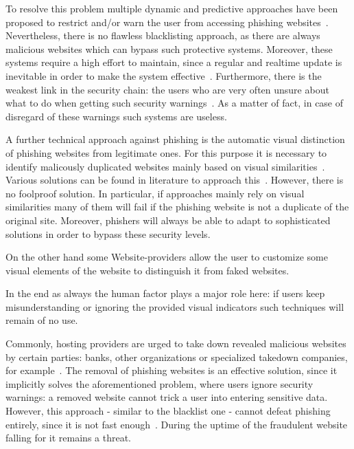 \begin{description}[leftmargin=0cm]
 To resolve this problem multiple dynamic and predictive approaches have been proposed to restrict and/or warn the user from accessing phishing websites~\cite{prakash2010phishnet, obied2009fraudulent, balzarotti2012proactive}. Nevertheless, there is no flawless blacklisting approach, as there are always malicious websites which can bypass such protective systems.
 Moreover, these systems require a high effort to maintain, since a regular and realtime update is inevitable in order to make the system effective~\cite{purkait2012phishing}. Furthermore, there is the weakest link in the security chain: the users who are very often unsure about what to do when getting such security warnings~\cite{bakhshi2009social}. As a matter of fact, in case of disregard of these warnings such systems are useless.
	\item[Visual distinction] A further technical approach against phishing is the automatic visual distinction of phishing websites from legitimate ones.
 For this purpose it is necessary to identify malicously duplicated websites mainly based on visual similarities~\cite{liu2006antiphishing}. Various solutions can be found in literature to approach this~\cite{chen2009fighting,chen2010detecting,zhang2011textual}. However, there is no foolproof solution.
 In particular, if approaches mainly rely on visual similarities many of them will fail if the phishing website is not a duplicate of the original site.
 Moreover, phishers will always be able to adapt to sophisticated solutions in order to bypass these security levels.

On the other hand some Website-providers allow the user to customize some visual elements of the website to distinguish it from faked websites.
 
In the end as always the human factor plays a major role here: if users keep misunderstanding or ignoring the provided visual indicators such techniques will remain of no use.

	\item[Takedown] Commonly, hosting providers are urged to take down revealed malicious websites by certain parties: banks, other organizations or specialized takedown companies, for example~\cite{moore2007examining}. The removal of phishing websites is an effective solution, since it implicitly solves the aforementioned problem, where users ignore security warnings: a removed website cannot trick a user into entering sensitive data.
 However, this approach - similar to the blacklist one - cannot defeat phishing entirely, since it is not fast enough~\cite{moore2007examining}. During the uptime of the fraudulent website falling for it remains a threat.

\end{description}

